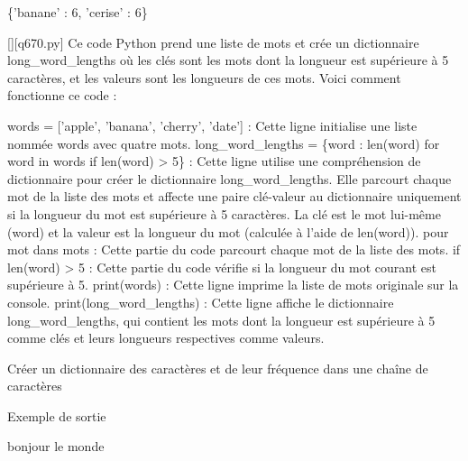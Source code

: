 \{'banane' : 6, 'cerise' : 6\}
        \par
        \begin{solution}
            \renewcommand{\nomfichier}{q670.py}
            \pythonfile{\chemincode \nomfichier}[][\nomfichier]
            Ce code Python prend une liste de mots et crée un dictionnaire long\_word\_lengths où les clés sont les mots dont la longueur est supérieure à 5 caractères, et les valeurs sont les longueurs de ces mots. Voici comment fonctionne ce code :

    words = ['apple', 'banana', 'cherry', 'date'] : Cette ligne initialise une liste nommée words avec quatre mots.
    long\_word\_lengths = \{word : len(word) for word in words if len(word) > 5\} : Cette ligne utilise une compréhension de dictionnaire pour créer le dictionnaire long\_word\_lengths. Elle parcourt chaque mot de la liste des mots et affecte une paire clé-valeur au dictionnaire uniquement si la longueur du mot est supérieure à 5 caractères. La clé est le mot lui-même (word) et la valeur est la longueur du mot (calculée à l'aide de len(word)).
        pour mot dans mots : Cette partie du code parcourt chaque mot de la liste des mots.
        if len(word) > 5 : Cette partie du code vérifie si la longueur du mot courant est supérieure à 5.
    print(words) : Cette ligne imprime la liste de mots originale sur la console.
    print(long\_word\_lengths) : Cette ligne affiche le dictionnaire long\_word\_lengths, qui contient les mots dont la longueur est supérieure à 5 comme clés et leurs longueurs respectives comme valeurs.
        \end{solution}
        

        \question
        Créer un dictionnaire des caractères et de leur fréquence dans une chaîne de caractères

Exemple de sortie

bonjour le monde

